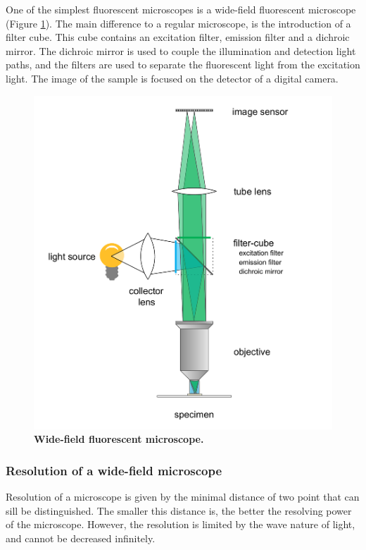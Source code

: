 \documentclass{tdk_style}
\begin{document}
One of the simplest fluorescent microscopes is a wide-field fluorescent microscope (Figure \ref{fig:wide-field}). The main difference to a regular microscope, is the introduction of a filter cube. This cube contains an excitation filter, emission filter and a dichroic mirror. The dichroic mirror is used to couple the illumination and detection light paths, and the filters are used to separate the fluorescent light from the excitation light. The image of the sample is focused on the detector of a digital camera.

\begin{figure}[htbp]
	\centering
	\includegraphics[scale=0.4]{figures/1_introduction/wide-field}
	\caption{\textbf{Wide-field fluorescent microscope.}}
	\label{fig:wide-field}
\end{figure}

\subsubsection{Resolution of a wide-field microscope}

Resolution of a microscope is given by the minimal distance of two point that can sill be distinguished. The smaller this distance is, the better the resolving power of the microscope. However, the resolution is limited by the wave nature of light, and cannot be decreased infinitely.
\end{document}
